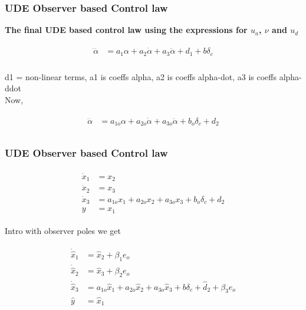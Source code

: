 \documentclass[table,10pt,red]{beamer}	%
\begin{document}
\begin{frame}
\frametitle{UDE Observer based Control law}
	\textbf{The final UDE based control law using the expressions for $u_a$, $\nu$ and $u_d$}

\begin{eqnarray*}
	\begin{aligned}
		\dddot{\alpha} &= a_1 \alpha + a_2 \dot{\alpha} + a_3 \ddot{\alpha} + d_1 + b\delta_c \\
	\end{aligned}
\label{eq5}
\end{eqnarray*}

d1 = non-linear terms, a1 is coeffs alpha, a2 is coeffs alpha-dot, a3 is coeffs alpha-ddot \\

Now,

\begin{eqnarray*}
	\begin{aligned}
		\dddot{\alpha} &= a_{1o} \alpha + a_{2o} \dot{\alpha} + a_{3o} \ddot{\alpha} + b_o\delta_c + d_2\\
	\end{aligned}
	\label{eq5}
\end{eqnarray*}


\end{frame}

\begin{frame}
\frametitle{UDE Observer based Control law}

\begin{eqnarray*}
	\begin{aligned}
		\dot{x}_1 &= x_2 \\
		\dot{x}_2 &= x_3 \\
		\dot{x}_3 &= a_{1o}x_1 + a_{2o}x_2 + a_{3o}x_3 + b_o \delta_c + d_2 \\
		y &= x_1 \label{rx1}
	\end{aligned}
	\label{eq5}
\end{eqnarray*}

Intro with observer poles we get

\begin{eqnarray*}
	\begin{aligned}
		\dot{\hat{x}}_1 &= \hat{x}_2 + \beta_1 e_o\\
		\dot{\hat{x}}_2 &= \hat{x}_3 + \beta_2 e_o\\
		\dot{\hat{x}}_3 &= a_{1o}\hat{x}_1 + a_{2o}\hat{x}_2 + a_{3o}\hat{x}_3 + b \delta_c + \hat{d}_2 + \beta_3 e_o\\		
		\hat{y} &= \hat{x}_1 \label{ss1}
	\end{aligned}
	\label{eq5}
\end{eqnarray*}

\end{frame}
\end{document}
